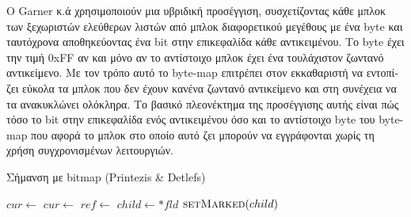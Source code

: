 \begin{greek}
Ο Garner κ.ά \cite{DBLP:conf/iwmm/GarnerBF07} χρησιμοποιούν μια
υβριδική προσέγγιση, συσχετίζοντας κάθε μπλοκ των ξεχωριστών 
ελεύθερων λιστών από μπλοκ διαφορετικού μεγέθους με ένα byte
και ταυτόχρονα αποθηκεύοντας ένα bit στην επικεφαλίδα κάθε
αντικειμένου. Το byte έχει την τιμή 0xFF αν και μόνο αν το
αντίστοιχο μπλοκ έχει ένα τουλάχιστον ζωντανό αντικείμενο.
Με τον τρόπο αυτό το byte-map επιτρέπει στον εκκαθαριστή να
εντοπίζει εύκολα τα μπλοκ που δεν έχουν κανένα ζωντανό αντικείμενο
και στη συνέχεια να τα ανακυκλώνει ολόκληρα. Το βασικό πλεονέκτημα
της προσέγγισης αυτής είναι πώς τόσο το bit στην επικεφαλίδα ενός 
αντικειμένου όσο και το αντίστοιχο byte του byte-map που αφορά
το μπλοκ στο οποίο αυτό ζει μπορούν να εγγράφονται χωρίς τη
χρήση συγχρονισμένων λειτουργιών.

\begin{algorithm}[H]
  \caption{Σήμανση με bitmap (Printezis \& Detlefs)}
  \label{alg:ms_4}
  \begin{algorithmic}[1]
      \State $cur \gets$ 
        \State {}
        \State {}
        \State $cur \gets$ 
      \EndWhile
    \EndProcedure
    \Statex
        \State $ref \gets$ 
          \State $child \gets *fld$
            \State $\Call{setMarked}{child}$
              \State {}
            \EndIf
          \EndIf
        \EndFor
      \EndWhile
    \EndProcedure
  \end{algorithmic}
\end{algorithm}


\end{greek}
